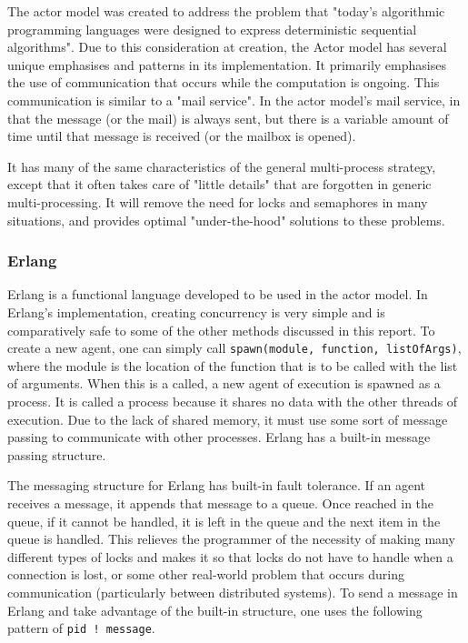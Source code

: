 \documentclass[12pt]{article}
\newcommand{\code}[1]{\lstinline[]{#1}}
\begin{document}
The actor model was created to address the problem that "today's algorithmic programming languages were designed to express deterministic sequential algorithms".
Due to this consideration at creation, the Actor model has several unique emphasises and patterns in its implementation.
It primarily emphasises the use of communication that occurs while the computation is ongoing. This communication is similar to a "mail service". In the actor model's mail service, in that the message (or the mail) is always sent, but there is a variable amount of time until that message is received (or the mailbox is opened).
\cite{actor_intro}

It has many of the same characteristics of the general multi-process strategy, except that it often takes care of "little details" that are forgotten in generic multi-processing. It will remove the need for locks and semaphores in many situations, and provides optimal "under-the-hood" solutions to these problems.

\subsubsection{Erlang}

Erlang is a functional language developed to be used in the actor model. In Erlang's implementation, creating concurrency is very simple and is comparatively safe to some of the other methods discussed in this report. To create a new agent, one can simply call \code{spawn(module, function, listOfArgs)}, where the module is the location of the function that is to be called with the list of arguments. When this is a called, a new agent of execution is spawned as a process. It is called a process because it shares no data with the other threads of execution. Due to the lack of shared memory, it must use some sort of message passing to communicate with other processes. Erlang has a built-in message passing structure.

The messaging structure for Erlang has built-in fault tolerance. If an agent receives a message, it appends that message to a queue. Once reached in the queue, if it cannot be handled, it is left in the queue and the next item in the queue is handled. This relieves the programmer of the necessity of making many different types of locks and makes it so that locks do not have to handle when a connection is lost, or some other real-world problem that occurs during communication (particularly between distributed systems). To send a message in Erlang and take advantage of the built-in structure, one uses the following pattern of \code{pid ! message}.
\end{document}
